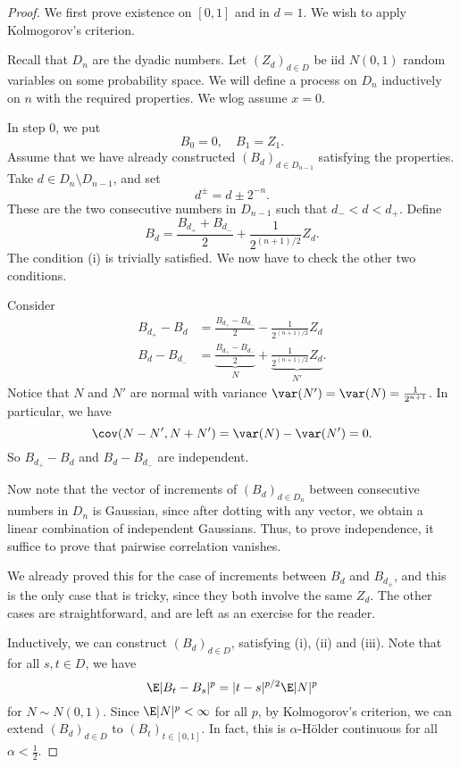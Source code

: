 \documentclass[a4paper]{article}
\begin{document}
\begin{proof}
  We first prove existence on $[0, 1]$ and in $d = 1$. We wish to apply Kolmogorov's criterion.

  Recall that $D_n$ are the dyadic numbers. Let $(Z_d)_{d \in D}$ be iid $N(0, 1)$ random variables on some probability space. We will define a process on $D_n$ inductively on $n$ with the required properties. We wlog assume $x = 0$.

  In step $0$, we put
  \[
    B_0 = 0,\quad B_1 = Z_1.
  \]
  Assume that we have already constructed $(B_d)_{d \in D_{n - 1}}$ satisfying the properties. Take $d \in D_n \setminus D_{n - 1}$, and set
  \[
    d^{\pm} = d \pm 2^{-n}.
  \]
  These are the two consecutive numbers in $D_{n - 1}$ such that $d_- < d < d_+$. Define
  \[
    B_d = \frac{B_{d_+} + B_{d_-}}{2} + \frac{1}{2^{(n + 1)/2}} Z_d.
  \]
  The condition (i) is trivially satisfied. We now have to check the other two conditions.

  Consider
  \begin{align*}
    B_{d_+} - B_d &= \frac{B_{d_+} - B_{d_-}}{2} - \frac{1}{2^{(n + 1)/2}} Z_d\\
    B_d - B_{d_-} &= \underbrace{\frac{B_{d_+} - B_{d_-}}{2}}_N + \underbrace{\frac{1}{2^{(n + 1)/2}} Z_d}_{N'}.
  \end{align*}
  Notice that $N$ and $N'$ are normal with variance $\var(N') = \var(N) = \frac{1}{2^{n + 1}}$. In particular, we have
  \[
    \cov(N - N', N + N') = \var(N) - \var(N') = 0.
  \]
  So $B_{d_+} - B_d$ and $B_d - B_{d_-}$ are independent.

  Now note that the vector of increments of $(B_d)_{d \in D_n}$ between consecutive numbers in $D_n$ is Gaussian, since after dotting with any vector, we obtain a linear combination of independent Gaussians. Thus, to prove independence, it suffice to prove that pairwise correlation vanishes.

  We already proved this for the case of increments between $B_d$ and $B_{d_{\pm}}$, and this is the only case that is tricky, since they both involve the same $Z_d$. The other cases are straightforward, and are left as an exercise for the reader.

  Inductively, we can construct $(B_d)_{d \in D}$, satisfying (i), (ii) and (iii). Note that for all $s, t \in D$, we have
  \[
    \E |B_t - B_s|^p = |t - s|^{p/2} \E |N|^p
  \]
  for $N \sim N(0, 1)$. Since $\E |N|^p < \infty$ for all $p$, by Kolmogorov's criterion, we can extend $(B_d)_{d \in D}$ to $(B_t)_{t \in [0, 1]}$. In fact, this is $\alpha$-H\"older continuous for all $\alpha < \frac{1}{2}$.


\end{proof}
\end{document}
